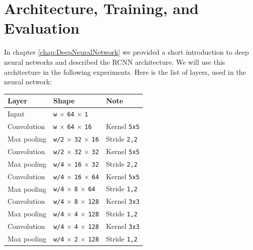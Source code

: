 \section{Architecture, Training, and Evaluation}
\label{sec:ArchitectureTrainingEvaluation}

In chapter \ref{chap:DeepNeuralNetwork} we provided a short introduction to deep neural networks and described the RCNN architecture. We will use this architecture in the following experiments. Here is the list of layers, used in the neural network:

\begin{table}[h] \centering
\begin{tabular}{lll}
\toprule
\textbf{Layer} & \textbf{Shape} & \textbf{Note} \\
\midrule
Input & \texttt{w} $\times$ \texttt{64} $\times$ \texttt{1} & \\
\midrule
Convolution & \texttt{w} $\times$ \texttt{64} $\times$ \texttt{16} & Kernel \texttt{5x5} \\
Max pooling & \texttt{w/2} $\times$ \texttt{32} $\times$ \texttt{16} & Stride \texttt{2,2} \\

Convolution & \texttt{w/2} $\times$ \texttt{32} $\times$ \texttt{32} & Kernel \texttt{5x5} \\
Max pooling & \texttt{w/4} $\times$ \texttt{16} $\times$ \texttt{32} & Stride \texttt{2,2} \\

Convolution & \texttt{w/4} $\times$ \texttt{16} $\times$ \texttt{64} & Kernel \texttt{5x5} \\
Max pooling & \texttt{w/4} $\times$ \texttt{8} $\times$ \texttt{64} & Stride \texttt{1,2} \\

Convolution & \texttt{w/4} $\times$ \texttt{8} $\times$ \texttt{128} & Kernel \texttt{3x3} \\
Max pooling & \texttt{w/4} $\times$ \texttt{4} $\times$ \texttt{128} & Stride \texttt{1,2} \\

Convolution & \texttt{w/4} $\times$ \texttt{4} $\times$ \texttt{128} & Kernel \texttt{3x3} \\
Max pooling & \texttt{w/4} $\times$ \texttt{2} $\times$ \texttt{128} & Stride \texttt{1,2} \\


\end{tabular}
\end{table}
